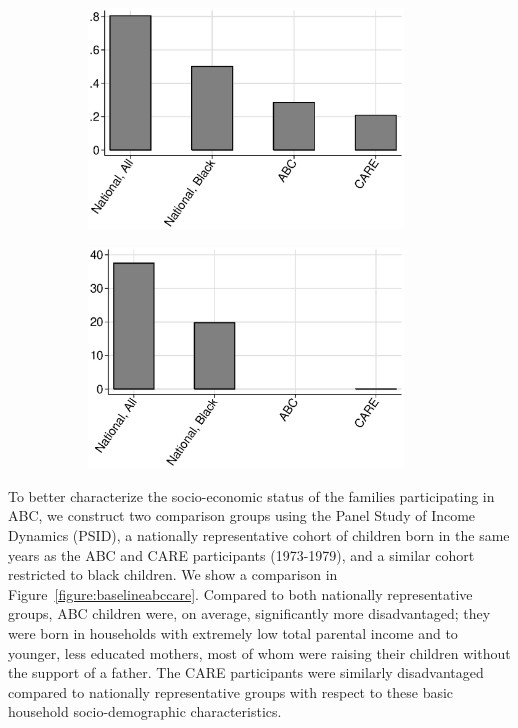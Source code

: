 \begin{figure}[H]
\begin{subfigure}{.5\textwidth}
  \centering
  \includegraphics[height=2.3in]{output/abccarepsid_f_home0pool.eps}
\end{subfigure}%
\begin{subfigure}{.5\textwidth}
  \centering
  \includegraphics[height=2.3in]{output/abccarepsid_p_inc0pool.eps}
\end{subfigure}
\end{figure}

\noindent To better characterize the socio-economic status of the families participating in ABC, we construct two comparison groups using the Panel Study of Income Dynamics (PSID), a nationally representative cohort of children born in the same years as the ABC and CARE participants (1973-1979), and a similar cohort restricted to black children. We show a comparison in Figure~\ref{figure:baselineabccare}. Compared to both nationally representative groups, ABC children were, on average, significantly more disadvantaged; they were born in households with extremely low total parental income and to younger, less educated mothers, most of whom were raising their children without the support of a father. The CARE participants were similarly disadvantaged compared to nationally representative groups with respect to these basic household socio-demographic characteristics.\\


